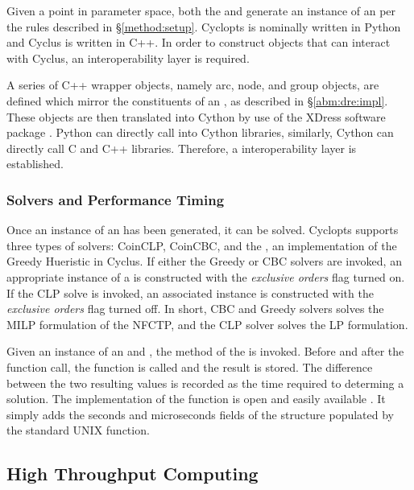 Given a point in parameter space, both the  and
 generate an instance of an  per the
rules described in \S \ref{method:setup}. Cyclopts is nominally written in
Python and Cyclus is written in C++. In order to construct objects that can
interact with Cyclus, an interoperability layer is required. 

A series of C++ wrapper objects, namely arc, node, and group objects, are
defined which mirror the constituents of an , as described
in \S \ref{abm:dre:impl}. These objects are then translated into Cython \cite{}
by use of the XDress software package \cite{xdress}. Python can directly call
into Cython libraries, similarly, Cython can directly call C and C++
libraries. Therefore, a interoperability layer is established.

\subsubsection{Solvers and Performance Timing}

Once an instance of an  has been generated, it can be
solved. Cyclopts supports three types of solvers: CoinCLP, CoinCBC, and the
, an implementation of the Greedy Hueristic in Cyclus. If
either the Greedy or CBC solvers are invoked, an appropriate instance of a
 is constructed with the \textit{exclusive orders} flag
turned on. If the CLP solve is invoked, an associated 
instance is constructed with the \textit{exclusive orders} flag turned off. In
short, CBC and Greedy solvers solves the MILP formulation of the NFCTP, and the
CLP solver solves the LP formulation.

Given an instance of an  and , the
 method of the  is invoked. Before and after
the  function call, the  function is called and
the result is stored. The difference between the two resulting values is
recorded as the time required to determing a solution. The implementation of the
 function is open and easily available \cite{}. It simply adds
the seconds and microseconds fields of the  structure populated
by the standard UNIX  function.

\subsection{High Throughput Computing}\label{method:tools:htc}

